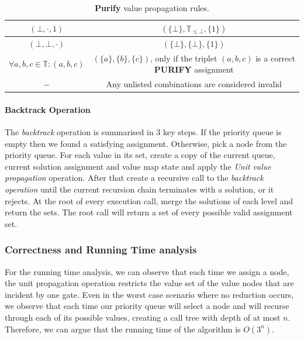 \begin{table}[h!]
\begin{tabular}{|c|c|}
        $(\bot, \cdot, 1)$                                                                   & $(\{\bot\}, \mathbb{T}_{\leq \bot}, \{1\})$                                                     \\ \hline
        $(\bot, \bot, \cdot)$                                                                & $(\{\bot\}, \{\bot\}, \{1\})$                                                                   \\ \hline
        $\forall a,b,c \in \mathbb{T}:  (a, b, c)$                                           & $(\{a\}, \{b\}, \{c \})$, only if the triplet $(a,b,c)$ is a correct \textbf{PURIFY} assignment \\ \hline
        $-$                                                                                  & Any unlisted combinations are considered invalid                                                \\\hline
    \end{tabular}
    \caption{\textbf{Purify} value propagation rules.}
    \label{tab:chap-4:pur-propagation}
\end{table}





\paragraph*{Backtrack Operation}
The \textit{backtrack} operation is summarised in 3 key steps.
If the priority queue is empty then we found a satisfying assignment.
Otherwise, pick a node from the priority queue. For each value in its set,
create a copy of the current queue, current solution assignment and value map state
and apply the \textit{Unit value propagation} operation. After that create a recursive call
to the \textit{backtrack operation} until the current recursion chain
terminates with a solution, or it rejects.
At the root of every execution call, merge the solutions of each level and return
the sets. The root call will return a set of every possible valid assignment set.


\subsubsection{Correctness and Running Time analysis}
\label{sec:rt-analysis}

For the running time analysis, we can observe that each time we assign a node,
the unit propagation operation restricts the value set of the value nodes that are incident
by one gate. Even in the worst case scenario where no reduction occurs, we observe that each time 
our priority queue will select a node and will recurse through each of its possible values,
creating a call tree with depth of at most $n$. Therefore, we can argue that the running time of the algorithm
is $O(3^n)$.


